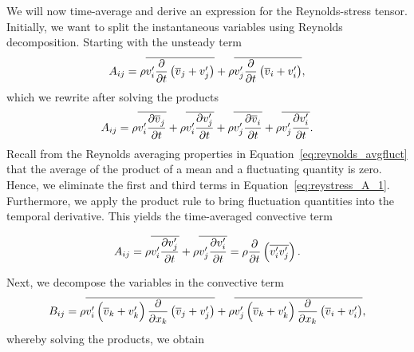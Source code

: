 We will now time-average and derive an expression for the Reynolds-stress tensor. Initially, we want to split the instantaneous variables using Reynolds decomposition. Starting with the unsteady term
\begin{equation}
	A_{ij}
	=
	\rho\overline{v_i^\prime \frac{\partial}{\partial t}\left(\overline v_j + v_j^\prime \right)} +
	\rho\overline{v_j^\prime \frac{\partial}{\partial t}\left(\overline v_i + v_{i\vphantom{j}}^\prime \right)}, 
\end{equation}
which we rewrite after solving the products
\begin{equation}
	A_{ij}
	=
	\rho \overline{v_i^\prime\frac{\partial\overline v_j^{\vphantom{\prime}}}{\partial t}} 
	+ \rho \overline{v_i^\prime\frac{\partial v_j^\prime}{\partial t}}
	+ \rho \overline{v_j^\prime\frac{\partial\overline v_{i\vphantom{j}}^{\vphantom{\prime}}}{\partial t}} 
	+ \rho \overline{v_j^\prime\frac{\partial v_{i\vphantom{j}}^\prime}{\partial t}}.
	\label{eq:reystress_A_1}
\end{equation}
Recall from the Reynolds averaging properties in Equation~\ref{eq:reynolds_avgfluct} that the average of the product of a mean and a fluctuating quantity is zero. Hence, we eliminate the first and third terms in Equation~\ref{eq:reystress_A_1}. Furthermore, we apply the product rule to bring fluctuation quantities into the temporal derivative. This yields the time-averaged convective term
\begin{eqBox}
\begin{equation}
	A_{ij}
	= \rho \overline{v_i^\prime\frac{\partial v_j^\prime}{\partial t}}
	+ \rho \overline{v_j^\prime\frac{\partial v_{i\vphantom{j}}^\prime}{\partial t}} 
	= \rho \frac{\partial}{\partial t} \left(\overline{v_i^\prime v_j^\prime}\right).
\end{equation}
\end{eqBox}
Next, we decompose the variables in the convective term
\begin{equation}
	B_{ij} =
	\rho \overline{v_i^\prime \left(\overline v_k+v_{k\vphantom{j}}^\prime\right)\frac{\partial}{\partial x_k}\left(\overline v_j+v_j^\prime\right)}
	+ \rho \overline{v_j^\prime \left(\overline v_k+v_{k\vphantom{j}}^\prime\right)\frac{\partial}{\partial x_k}\left(\overline v_i+v_{i\vphantom{j}}^\prime\right)},
\end{equation} 
whereby solving the products, we obtain
